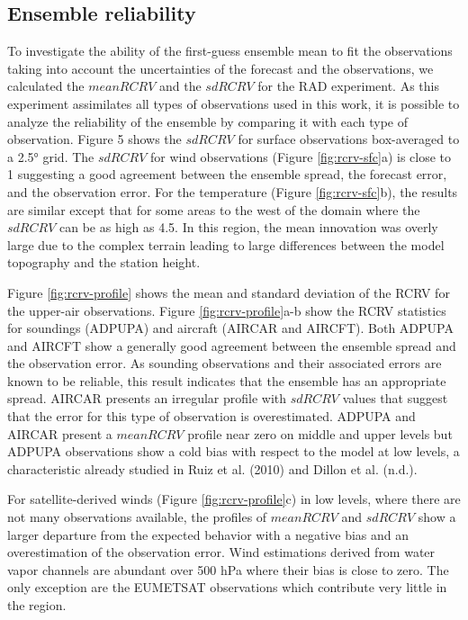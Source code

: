\documentclass[final,5p,times,twocolumn,authoryear]{elsarticle} %
\begin{document}
\hypertarget{ensemble-reliability}{%
\subsection{Ensemble reliability}\label{ensemble-reliability}}

To investigate the ability of the first-guess ensemble mean to fit the observations taking into account the uncertainties of the forecast and the observations, we calculated the \(mean RCRV\) and the \(sd RCRV\) for the RAD experiment. As this experiment assimilates all types of observations used in this work, it is possible to analyze the reliability of the ensemble by comparing it with each type of observation. Figure 5 shows the \(sd RCRV\) for surface observations box-averaged to a 2.5° grid. The \(sd RCRV\) for wind observations (Figure \ref{fig:rcrv-sfc}a) is close to 1 suggesting a good agreement between the ensemble spread, the forecast error, and the observation error. For the temperature (Figure \ref{fig:rcrv-sfc}b), the results are similar except that for some areas to the west of the domain where the \(sd RCRV\) can be as high as 4.5. In this region, the mean innovation was overly large due to the complex terrain leading to large differences between the model topography and the station height.

Figure \ref{fig:rcrv-profile} shows the mean and standard deviation of the RCRV for the upper-air observations. Figure \ref{fig:rcrv-profile}a-b show the RCRV statistics for soundings (ADPUPA) and aircraft (AIRCAR and AIRCFT). Both ADPUPA and AIRCFT show a generally good agreement between the ensemble spread and the observation error. As sounding observations and their associated errors are known to be reliable, this result indicates that the ensemble has an appropriate spread. AIRCAR presents an irregular profile with \(sd RCRV\) values that suggest that the error for this type of observation is overestimated. ADPUPA and AIRCAR present a \(mean RCRV\) profile near zero on middle and upper levels but ADPUPA observations show a cold bias with respect to the model at low levels, a characteristic already studied in Ruiz et al. (2010) and Dillon et al. (n.d.).

For satellite-derived winds (Figure \ref{fig:rcrv-profile}c) in low levels, where there are not many observations available, the profiles of \(mean RCRV\) and \(sd RCRV\) show a larger departure from the expected behavior with a negative bias and an overestimation of the observation error. Wind estimations derived from water vapor channels are abundant over 500 hPa where their bias is close to zero. The only exception are the EUMETSAT observations which contribute very little in the region.
\end{document}
